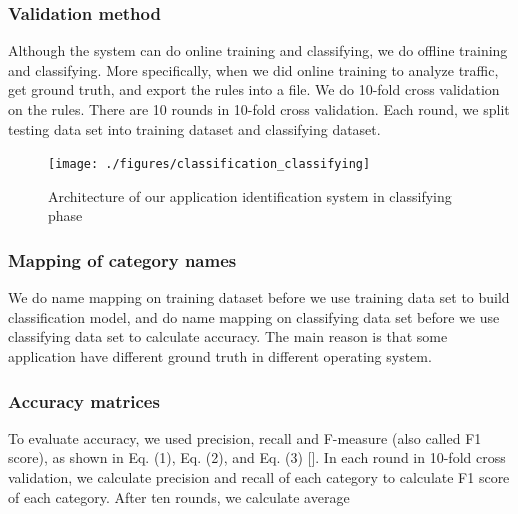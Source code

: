 \documentclass[journal]{IEEEtran}
\begin{document}
\subsubsection{Validation method}
Although the system can do online training and classifying, we do offline training and classifying. More specifically, when we did online training to analyze traffic, get ground truth, and export the rules into a file. We do 10-fold cross validation on the rules. There are 10 rounds in 10-fold cross validation. Each round, we split testing data set into training dataset and classifying dataset.

\begin{figure}[!t]
\centering
\texttt{[image: ./figures/classification\_classifying]}
\caption{Architecture of our application identification system in classifying phase}
\label{fig:classifcation_evaluation}
\end{figure}

\subsubsection{Mapping of category names}
We do name mapping on training dataset before we use training data set to build classification model, and do name mapping on classifying data set before we use classifying data set to calculate accuracy. The main reason is that some application have different ground truth in different operating system.

\subsubsection{Accuracy matrices}
To evaluate accuracy, we used precision, recall and F-measure (also called F1 score), as shown in Eq. (1), Eq. (2), and Eq. (3) []. In each round in 10-fold cross validation, we calculate precision and recall of each category to calculate F1 score of each category. After ten rounds, we calculate average





\newpage



\end{document}
